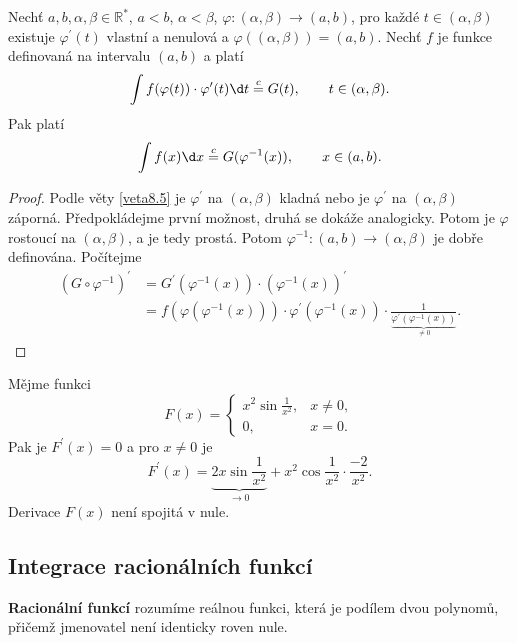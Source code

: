 \begin{veta} \label{veta8.7}
Nechť $a,b,\alpha,\beta \in \mathbb{R}^*$, $a<b$, $\alpha<\beta$, $\varphi : (\alpha,\beta) \to (a,b)$,
pro každé $t \in(\alpha, \beta)$ existuje $\varphi^\prime(t)$ vlastní a nenulová a
$\varphi((\alpha, \beta)) = (a,b)$. Nechť $f$ je funkce definovaná na intervalu $(a,b)$ a platí
\[
\int f(\varphi(t)) \cdot\varphi'(t)\d t \stackrel{c}{=} G(t), \qquad t \in (\alpha,\beta).
\]
Pak platí
\[
\int f(x)\d x \stackrel{c}{=} G(\varphi^{-1}(x)), \qquad x \in (a,b).
\]
\end{veta}

\begin{proof}
	Podle věty \ref{veta8.5} je $\varphi^\prime$ na $(\alpha, \beta)$ kladná nebo je
	$\varphi^\prime$ na $(\alpha, \beta)$
	záporná. Předpokládejme první možnost, druhá se dokáže analogicky. Potom je $\varphi$ rostoucí na
	$(\alpha, \beta)$, a je tedy prostá. Potom $\varphi^{-1}: (a,b)\to (\alpha, \beta)$ je dobře definována.
	Počítejme
	\begin{align*}
	\left( G\circ \varphi^{-1} \right )^\prime &= G^\prime \left(\varphi^{-1}(x)\right)\cdot \left(\varphi^{-1}(x)\right)^\prime\\
&= f \left( \varphi(\varphi^{-1}(x)) \right )\cdot \varphi^\prime \left( \varphi^{-1}(x) \right )\cdot \frac{1}{\underbrace{\varphi^\prime \left( \varphi^{-1}(x) \right ) }_{\ne 0}}.
\end{align*}
\end{proof}

\begin{priklad}
	Mějme funkci
	$$
	    F(x) = \begin{cases}
						x^2 \sin \frac{1}{x^2}, & x \ne 0,\\
						0, & x=0.
					\end{cases}
	$$
	Pak je $F^\prime(x)=0$ a pro $x\ne 0$ je
	$$
	    F^\prime(x)=\underbrace{2x\sin \frac{1}{x^2}}_{\to 0} + x^2 \cos \frac{1}{x^2}\cdot \frac{-2}{x^2}.
	$$
	Derivace $F(x)$ není spojitá v nule.
\end{priklad}

\subsection*{Integrace racionálních funkcí}
\begin{definice}
\textbf{Racionální funkcí} rozumíme reálnou funkci, která je podílem dvou polynomů, přičemž jmenovatel není identicky roven nule.
\end{definice}

